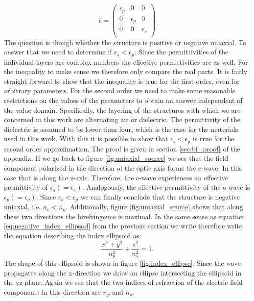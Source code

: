 \begin{equation}
    \label{eq:rytov_tensor}
    \hat{\epsilon} = 
    \begin{pmatrix}
        \epsilon_{p} & 0 & 0 \\
        0 & \epsilon_{p} & 0 \\
        0 & 0 & \epsilon_{s} \\
    \end{pmatrix}
\end{equation}
The question is though whether the structure is positive or negative uniaxial. To answer that we need to determine if $\epsilon_{s} < \epsilon_{p}$. Since the permittivities of the individual layers are complex numbers the effective permittivities are as well. For the inequality to make sense we therefore only compare the real parts. It is fairly straight forward to show that the inequality is true for the first order, even for arbitrary parameters. For the second order we need to make some reasonable restrictions on the values of the parameters to obtain an answer independent of the value domain. Specifically, the layering of the structures with which we are concerned in this work are alternating air or dielectric. The permittivity of the dielectric is assumed to be lower than four, which is the case for the materials used in this work. With this it is possible to show that $\epsilon_{s} < \epsilon_{p}$ is true for the second order approximation. The proof is given in section \ref{sec:bf_proof} of the appendix. If we go back to figure \ref{fig:uniaxial_source} we see that the field component polarized in the direction of the optic axis forms the e-wave. In this case that is along the z-axis. Therefore, the e-wave experiences an effective permittivity of $\epsilon_{s}(=\epsilon_{e})$. Analogously, the effective permittivity of the o-wave is $\epsilon_{p}(=\epsilon_{o})$. Since $\epsilon_{s} < \epsilon_{p}$ we can finally conclude that the structure is negative uniaxial, i.e. $n_e < n_o$. Additionally, figure \ref{fig:uniaxial_source} shows that along these two directions the birefringence is maximal. 
In the same sense as equation \ref{eq:negative_index_ellipsod} from the previous section we write therefore write the equation describing the index ellipsoid as:
\begin{equation}
    \frac{x^2+y^2}{n_p^2}+\frac{z^2}{n_s^2}=1.
\end{equation}
The shape of this ellipsoid is shown in figure \ref{fig:index_ellipse}. Since the wave propagates along the x-direction we draw an ellipse intersecting the ellipsoid in the yz-plane. Again we see that the two indices of refraction of the electric field components in this direction are $n_{p}$ and $n_{s}$. 
